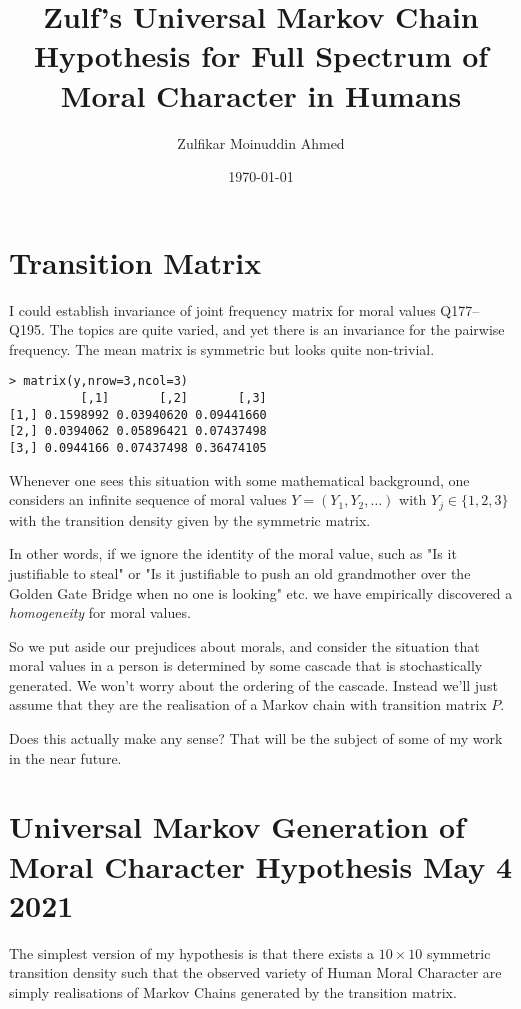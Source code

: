 \documentclass{amsart}
\title{Zulf's Universal Markov Chain Hypothesis for Full Spectrum of Moral Character in Humans}
\author{Zulfikar Moinuddin Ahmed}
\date{\today}
\begin{document}
\maketitle

\section{Transition Matrix}

I could establish invariance of joint frequency matrix for moral values Q177--Q195.  The topics are quite varied, and yet there is an invariance for the pairwise frequency.   The mean matrix is symmetric but looks quite non-trivial.

\begin{verbatim}
> matrix(y,nrow=3,ncol=3)
          [,1]       [,2]       [,3]
[1,] 0.1598992 0.03940620 0.09441660
[2,] 0.0394062 0.05896421 0.07437498
[3,] 0.0944166 0.07437498 0.36474105
\end{verbatim}
Whenever one sees this situation with some mathematical background, one considers an infinite sequence of moral values $Y= (Y_1,Y_2,\dots)$ with $Y_j \in \{1,2,3\}$ with the transition density given by the symmetric matrix.  

In other words, if we ignore the identity of the moral value, such as "Is it justifiable to steal" or "Is it justifiable to push an old grandmother over the Golden Gate Bridge when no one is looking" etc. we have empirically discovered a {\em homogeneity} for moral values.  

So we put aside our prejudices about morals, and consider the situation that moral values in a person is determined by some cascade that is stochastically generated.  We won't worry about the ordering of the cascade.  Instead we'll just assume that they are the realisation of a Markov chain with transition matrix $P$.

Does this actually make any sense?  That will be the subject of some of my work in the near future.

\section{Universal Markov Generation of Moral Character Hypothesis May 4 2021}

The simplest version of my hypothesis is that there exists a $10\times 10$ symmetric transition density such that the observed variety of Human Moral Character are simply realisations of Markov Chains generated by the transition matrix.
\end{document}
